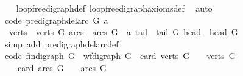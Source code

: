 \begin{isabellebody}
%
\isadelimproof
\ \ %
\endisadelimproof
%
\isatagproof
{}\isamarkupfalse%
\ loopfree{\isacharunderscore}{\kern0pt}digraph{\isacharunderscore}{\kern0pt}def\ loopfree{\isacharunderscore}{\kern0pt}digraph{\isacharunderscore}{\kern0pt}axioms{\isacharunderscore}{\kern0pt}def\ \isamarkupfalse%
\ auto%
\endisatagproof
{\isafoldproof}%
%
\isadelimproof
\isanewline
%
\endisadelimproof
\isanewline
{}\isamarkupfalse%
\ {\isacharbrackleft}{\kern0pt}code{\isacharbrackright}{\kern0pt}{\isacharcolon}{\kern0pt}\ {\isachardoublequoteopen}pre{\isacharunderscore}{\kern0pt}digraph{\isachardot}{\kern0pt}del{\isacharunderscore}{\kern0pt}arc\ G\ a\ {\isacharequal}{\kern0pt}\isanewline
\ {\isasymlparr}\ verts\ {\isacharequal}{\kern0pt}\ verts\ G{\isacharcomma}{\kern0pt}\ arcs\ {\isacharequal}{\kern0pt}\ arcs\ G\ {\isacharminus}{\kern0pt}\ {\isacharbraceleft}{\kern0pt}a{\isacharbraceright}{\kern0pt}{\isacharcomma}{\kern0pt}\ tail\ {\isacharequal}{\kern0pt}\ tail\ G{\isacharcomma}{\kern0pt}\ head\ {\isacharequal}{\kern0pt}\ head\ G\ {\isasymrparr}{\isachardoublequoteclose}\isanewline
%
\isadelimproof
\ \ %
\endisadelimproof
%
\isatagproof
{}\isamarkupfalse%
\ {\isacharparenleft}{\kern0pt}simp\ add{\isacharcolon}{\kern0pt}\ pre{\isacharunderscore}{\kern0pt}digraph{\isachardot}{\kern0pt}del{\isacharunderscore}{\kern0pt}arc{\isacharunderscore}{\kern0pt}def{\isacharparenright}{\kern0pt}%
\endisatagproof
{\isafoldproof}%
%
\isadelimproof
\isanewline
%
\endisadelimproof
\isanewline
\isanewline
{}\isamarkupfalse%
\ {\isacharbrackleft}{\kern0pt}code{\isacharbrackright}{\kern0pt}{\isacharcolon}{\kern0pt}\ {\isachardoublequoteopen}fin{\isacharunderscore}{\kern0pt}digraph\ G\ {\isacharequal}{\kern0pt}\ {\isacharparenleft}{\kern0pt}wf{\isacharunderscore}{\kern0pt}digraph\ G\ {\isasymand}\ {\isacharparenleft}{\kern0pt}card\ {\isacharparenleft}{\kern0pt}verts\ G{\isacharparenright}{\kern0pt}\ {\isachargreater}{\kern0pt}\ {}\ {\isasymor}\ verts\ G\ {\isacharequal}{\kern0pt}\ {\isacharbraceleft}{\kern0pt}{\isacharbraceright}{\kern0pt}{\isacharparenright}{\kern0pt}\isanewline
\ \ \ {\isasymand}\ {\isacharparenleft}{\kern0pt}{\isacharparenleft}{\kern0pt}card\ {\isacharparenleft}{\kern0pt}arcs\ G{\isacharparenright}{\kern0pt}\ {\isachargreater}{\kern0pt}\ {}\ {\isasymor}\ arcs\ G\ {\isacharequal}{\kern0pt}\ {\isacharbraceleft}{\kern0pt}{\isacharbraceright}{\kern0pt}{\isacharparenright}{\kern0pt}{\isacharparenright}{\kern0pt}{\isacharparenright}{\kern0pt}{\isachardoublequoteclose}\ \isanewline
%

\end{isabellebody}
